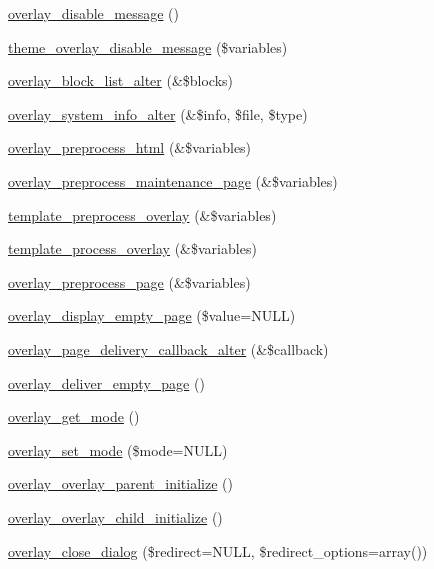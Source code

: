 \begin{DoxyCompactItemize}
\item 
\hyperlink{overlay_8module_af11fb3f5880badcf13c3254e755435a9}{overlay\_\-disable\_\-message} ()
\item 
\hyperlink{group__themeable_ga2f95531a7317b7c7ed20e9e7ac411793}{theme\_\-overlay\_\-disable\_\-message} (\$variables)
\item 
\hyperlink{overlay_8module_a507bf99a50710b798ef39ff0e74b41a8}{overlay\_\-block\_\-list\_\-alter} (\&\$blocks)
\item 
\hyperlink{overlay_8module_aa8e4ba0eea8feabeb12f50a884228b07}{overlay\_\-system\_\-info\_\-alter} (\&\$info, \$file, \$type)
\item 
\hyperlink{overlay_8module_a8f2deaecc65693dae5a5e7dc57f20315}{overlay\_\-preprocess\_\-html} (\&\$variables)
\item 
\hyperlink{overlay_8module_a32721f70b2f31af42ebf8ffb875f5963}{overlay\_\-preprocess\_\-maintenance\_\-page} (\&\$variables)
\item 
\hyperlink{overlay_8module_a490f0cf3842ad8381b483be8ec42a153}{template\_\-preprocess\_\-overlay} (\&\$variables)
\item 
\hyperlink{overlay_8module_af403d52da9cddcf63a30aa53bb813ee1}{template\_\-process\_\-overlay} (\&\$variables)
\item 
\hyperlink{overlay_8module_a7a891bb3f936f2e18d958f31dbed275c}{overlay\_\-preprocess\_\-page} (\&\$variables)
\item 
\hyperlink{overlay_8module_ad2c28dedc5eeec4a4374139bc1ba3a61}{overlay\_\-display\_\-empty\_\-page} (\$value=NULL)
\item 
\hyperlink{overlay_8module_a54e376c8ac21f0bbec738c1223a07a33}{overlay\_\-page\_\-delivery\_\-callback\_\-alter} (\&\$callback)
\item 
\hyperlink{overlay_8module_ab3390e845af4437b752db858c494d9a7}{overlay\_\-deliver\_\-empty\_\-page} ()
\item 
\hyperlink{overlay_8module_a3d783a955948f187d6777f7671531621}{overlay\_\-get\_\-mode} ()
\item 
\hyperlink{overlay_8module_a140f35bbeb7988cef4be585beba86348}{overlay\_\-set\_\-mode} (\$mode=NULL)
\item 
\hyperlink{overlay_8module_abdd40e3e9b268d5bf86e401d31c3279f}{overlay\_\-overlay\_\-parent\_\-initialize} ()
\item 
\hyperlink{overlay_8module_ae31d98a9d95f98e29351849a0180f028}{overlay\_\-overlay\_\-child\_\-initialize} ()
\item 
\hyperlink{overlay_8module_ac3433acbde98b1d6401468c811022264}{overlay\_\-close\_\-dialog} (\$redirect=NULL, \$redirect\_\-options=array())

\end{DoxyCompactItemize}
